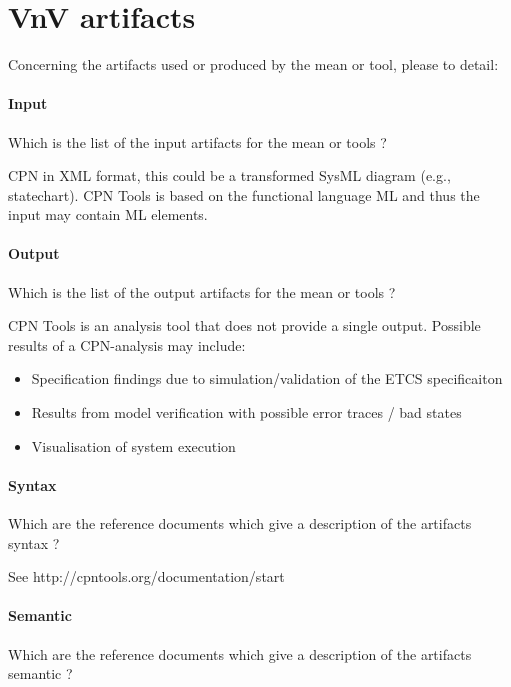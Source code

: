 \section{VnV artifacts}


Concerning the artifacts used or produced by the mean or tool, please to detail:

\paragraph{Input}
    Which is the list of the input artifacts for the mean or tools ?

\begin{author_comment}
   CPN in XML format, this could be a transformed SysML diagram (e.g., statechart). CPN Tools is based on the functional language ML and thus the input may contain ML elements.
\end{author_comment}
    
    
\paragraph{Output}
    Which is the list of the output artifacts for the mean or tools ?

\begin{author_comment}
   CPN Tools is an analysis tool that does not provide a single output. Possible results of a CPN-analysis may include:
   \begin{itemize}
     \item Specification findings due to simulation/validation of the ETCS specificaiton
     \item Results from model verification with possible error traces / bad states
     \item Visualisation of system execution
   \end{itemize}
\end{author_comment}


    
\paragraph{Syntax}
    Which are the reference documents which give a description of the artifacts syntax  ?

\begin{author_comment}
   See http://cpntools.org/documentation/start
\end{author_comment}
    
\paragraph{Semantic}
    Which are the reference documents which give a description of the artifacts semantic  ?

